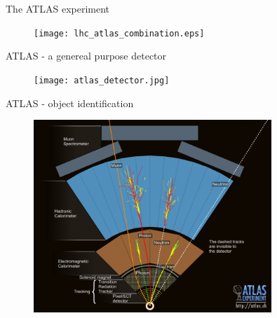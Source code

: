 \begin{frame}{The ATLAS experiment}
    \begin{figure}
        \centering
        \texttt{[image: lhc\_atlas\_combination.eps]}
        \caption{\cite{Pequenao:1095924}}
        \label{fig:my_label}
    \end{figure}
\end{frame}

\begin{frame}{ATLAS - a genereal purpose detector}
    \begin{figure}
        \centering
        \texttt{[image: atlas\_detector.jpg]}
        \caption{\cite{Pequenao:1095924}}
        \label{fig:my_label}
    \end{figure}
\end{frame}


\begin{frame}{ATLAS - object identification}
    \begin{figure}
        \centering
        \includegraphics[width=0.8\textwidth]{figures_theory/atlas_quer.jpg}
        \caption{\cite{Pequenao:1095924}}
        \label{fig:my_label}
    \end{figure}
\end{frame}



